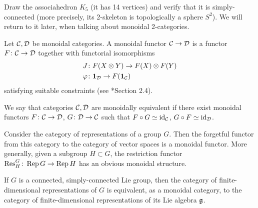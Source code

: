 \begin{exercise}\label{ec:K5}
  Draw the associahedron $K_5$ (it has 14 vertices) and verify that it is
  simply-connected (more precisely, its 2-skeleton is topologically a sphere
  $S^2$). We will return to it later, when talking about monoidal 2-categories.
\end{exercise}

\begin{definition}\label{d:monoidal_functor}
  Let $\mathcal{C}, \mathcal{D}$ be monoidal categories. A monoidal functor
  $\mathcal{C}\to \mathcal{D}$ is a functor $F\colon\mathcal{C}\to\mathcal{D}$ together
  with functorial isomorphisms
  \begin{align*}
    J&\colon F(X\otimes Y)\to F(X)\otimes F(Y)\\
    \varphi&\colon \mathbf{1}_{\mathcal{D}}\to F(\mathbf{1}_{\mathcal{C}})
  \end{align*}
  satisfying suitable constraints (see *{Section 2.4}).

  We say that categories $\mathcal{C}, \mathcal{D}$ are monoidally equivalent
  if there exist monoidal functors $F\colon \mathcal{C}\to \mathcal{D}$, $G\colon \mathcal{D}\to
  \mathcal{C}$ such that $F\circ G\simeq \operatorname{id}_{\mathcal{C}}$, $G\circ F \simeq \operatorname{id}_{\mathcal{D}}$.
\end{definition}


\begin{example}
  Consider the category of representations of a group $G$. Then the
  forgetful functor from this category to the category of vector
  spaces is a monoidal functor. More generally, given
  a subgroup $H\subset G$, the restriction functor
  $\operatorname{Res}^G_H\colon \operatorname{Rep} G\to\operatorname{Rep} H$ has an
  obvious monoidal structure.
\end{example}
\begin{example}
  If $G$ is a connected, simply-connected Lie group, then the category
  of finite-dimensional representations of $G$ is equivalent, as a
  monoidal category, to the category of finite-dimensional
  representations of its Lie
  algebra $\mathfrak{g}$.
\end{example}

